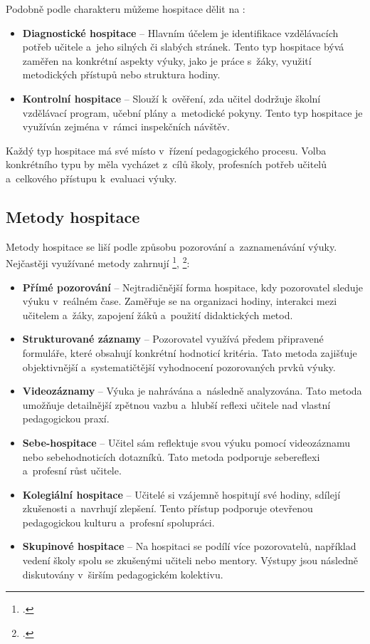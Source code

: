 Podobně podle charakteru můžeme hospitace dělit na :
\begin{itemize}
    \item \textbf{Diagnostické hospitace} – Hlavním účelem je identifikace vzdělávacích potřeb učitele a~jeho silných či slabých stránek. Tento typ hospitace bývá zaměřen na konkrétní aspekty výuky, jako je práce s~žáky, využití metodických přístupů nebo struktura hodiny.
    \item \textbf{Kontrolní hospitace} – Slouží k~ověření, zda učitel dodržuje školní vzdělávací program, učební plány a~metodické pokyny. Tento typ hospitace je využíván zejména v~rámci inspekčních návštěv.
\end{itemize}

Každý typ hospitace má své místo v~řízení pedagogického procesu. Volba konkrétního typu by měla vycházet z~cílů školy, profesních potřeb učitelů a~celkového přístupu k~evaluaci výuky.

\subsection{Metody hospitace}

Metody hospitace se liší podle způsobu pozorování a~zaznamenávání výuky. Nejčastěji využívané metody zahrnují \footcite{nastroje-hodnoceni}, \footcite{ped-proces-rizeni}:

\begin{itemize}
    \item \textbf{Přímé pozorování} – Nejtradičnější forma hospitace, kdy pozorovatel sleduje výuku v~reálném čase. Zaměřuje se na organizaci hodiny, interakci mezi učitelem a~žáky, zapojení žáků a~použití didaktických metod.
    \item \textbf{Strukturované záznamy} – Pozorovatel využívá předem připravené formuláře, které obsahují konkrétní hodnoticí kritéria. Tato metoda zajišťuje objektivnější a~systematičtější vyhodnocení pozorovaných prvků výuky.
    \item \textbf{Videozáznamy} – Výuka je nahrávána a~následně analyzována. Tato metoda umožňuje detailnější zpětnou vazbu a~hlubší reflexi učitele nad vlastní pedagogickou praxí.
    \item \textbf{Sebe-hospitace} – Učitel sám reflektuje svou výuku pomocí videozáznamu nebo sebehodnoticích dotazníků. Tato metoda podporuje sebereflexi a~profesní růst učitele.
    \item \textbf{Kolegiální hospitace} – Učitelé si vzájemně hospitují své hodiny, sdílejí zkušenosti a~navrhují zlepšení. Tento přístup podporuje otevřenou pedagogickou kulturu a~profesní spolupráci.
    \item \textbf{Skupinové hospitace} – Na hospitaci se podílí více pozorovatelů, například vedení školy spolu se zkušenými učiteli nebo mentory. Výstupy jsou následně diskutovány v~širším pedagogickém kolektivu.
\end{itemize}


